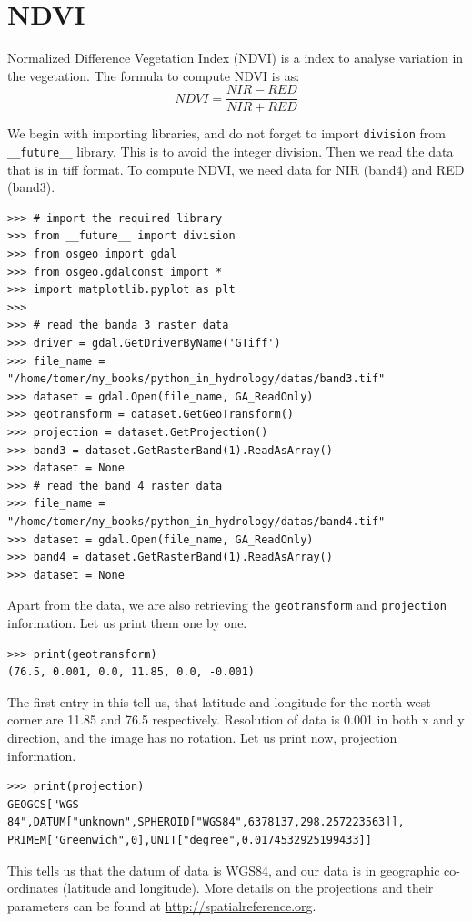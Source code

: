 \documentclass[10pt]{book}
\begin{document}
{\section{NDVI}
Normalized Difference Vegetation Index (NDVI) is a index to analyse variation in the vegetation. The formula to compute NDVI is as:
\begin{equation}
NDVI = \frac{NIR-RED}{NIR+RED}
\end{equation}

We begin with importing libraries, and do not forget to import \verb"division" from \verb"__future__" library. This is to avoid the integer division. Then we read the data that is in tiff format. To compute NDVI, we need data for NIR (band4) and RED (band3). 
\beforeverb \begin{verbatim}
>>> # import the required library
>>> from __future__ import division
>>> from osgeo import gdal
>>> from osgeo.gdalconst import *
>>> import matplotlib.pyplot as plt
>>> 
>>> # read the banda 3 raster data 
>>> driver = gdal.GetDriverByName('GTiff')
>>> file_name = "/home/tomer/my_books/python_in_hydrology/datas/band3.tif"
>>> dataset = gdal.Open(file_name, GA_ReadOnly)
>>> geotransform = dataset.GetGeoTransform()
>>> projection = dataset.GetProjection()
>>> band3 = dataset.GetRasterBand(1).ReadAsArray()
>>> dataset = None
>>> # read the band 4 raster data
>>> file_name = "/home/tomer/my_books/python_in_hydrology/datas/band4.tif"
>>> dataset = gdal.Open(file_name, GA_ReadOnly)
>>> band4 = dataset.GetRasterBand(1).ReadAsArray()
>>> dataset = None
\end{verbatim} \afterverb

Apart from the data, we are also retrieving the \verb"geotransform" and \verb"projection" information. Let us print them one by one. 
\beforeverb \begin{verbatim}
>>> print(geotransform)
(76.5, 0.001, 0.0, 11.85, 0.0, -0.001)
\end{verbatim} \afterverb
The first entry in this tell us, that latitude and longitude for the north-west corner are 11.85 and 76.5 respectively. Resolution of data is 0.001 in both x and y direction, and the image has no rotation. Let us print now, projection information. 
\beforeverb \begin{verbatim}
>>> print(projection)
GEOGCS["WGS 84",DATUM["unknown",SPHEROID["WGS84",6378137,298.257223563]],
PRIMEM["Greenwich",0],UNIT["degree",0.0174532925199433]]
\end{verbatim} \afterverb
This tells us that the datum of data is WGS84, and our data is in geographic co-ordinates (latitude and longitude). More details on the projections and their parameters can be found at \url{http://spatialreference.org}. \\

}
\end{document}
